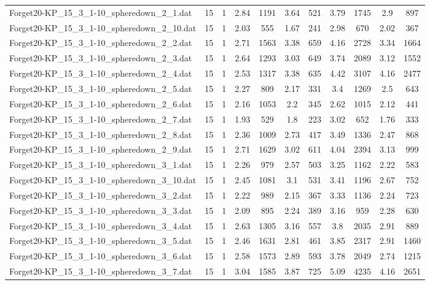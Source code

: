 \begin{table}[!ht]
\begin{tabular}{lcccccccccc}
Forget20-KP\_15\_3\_1-10\_spheredown\_2\_1.dat & 15 & 1 & 2.84 & 1191 & 3.64 & 521 & 3.79 & 1745 & 2.9 & 897 \\
Forget20-KP\_15\_3\_1-10\_spheredown\_2\_10.dat & 15 & 1 & 2.03 & 555 & 1.67 & 241 & 2.98 & 670 & 2.02 & 367 \\
Forget20-KP\_15\_3\_1-10\_spheredown\_2\_2.dat & 15 & 1 & 2.71 & 1563 & 3.38 & 659 & 4.16 & 2728 & 3.34 & 1664 \\
Forget20-KP\_15\_3\_1-10\_spheredown\_2\_3.dat & 15 & 1 & 2.64 & 1293 & 3.03 & 649 & 3.74 & 2089 & 3.12 & 1552 \\
Forget20-KP\_15\_3\_1-10\_spheredown\_2\_4.dat & 15 & 1 & 2.53 & 1317 & 3.38 & 635 & 4.42 & 3107 & 4.16 & 2477 \\
Forget20-KP\_15\_3\_1-10\_spheredown\_2\_5.dat & 15 & 1 & 2.27 & 809 & 2.17 & 331 & 3.4 & 1269 & 2.5 & 643 \\
Forget20-KP\_15\_3\_1-10\_spheredown\_2\_6.dat & 15 & 1 & 2.16 & 1053 & 2.2 & 345 & 2.62 & 1015 & 2.12 & 441 \\
Forget20-KP\_15\_3\_1-10\_spheredown\_2\_7.dat & 15 & 1 & 1.93 & 529 & 1.8 & 223 & 3.02 & 652 & 1.76 & 333 \\
Forget20-KP\_15\_3\_1-10\_spheredown\_2\_8.dat & 15 & 1 & 2.36 & 1009 & 2.73 & 417 & 3.49 & 1336 & 2.47 & 868 \\
Forget20-KP\_15\_3\_1-10\_spheredown\_2\_9.dat & 15 & 1 & 2.71 & 1629 & 3.02 & 611 & 4.04 & 2394 & 3.13 & 999 \\
Forget20-KP\_15\_3\_1-10\_spheredown\_3\_1.dat & 15 & 1 & 2.26 & 979 & 2.57 & 503 & 3.25 & 1162 & 2.22 & 583 \\
Forget20-KP\_15\_3\_1-10\_spheredown\_3\_10.dat & 15 & 1 & 2.45 & 1081 & 3.1 & 531 & 3.41 & 1196 & 2.67 & 752 \\
Forget20-KP\_15\_3\_1-10\_spheredown\_3\_2.dat & 15 & 1 & 2.22 & 989 & 2.15 & 367 & 3.33 & 1136 & 2.24 & 723 \\
Forget20-KP\_15\_3\_1-10\_spheredown\_3\_3.dat & 15 & 1 & 2.09 & 895 & 2.24 & 389 & 3.16 & 959 & 2.28 & 630 \\
Forget20-KP\_15\_3\_1-10\_spheredown\_3\_4.dat & 15 & 1 & 2.63 & 1305 & 3.16 & 557 & 3.8 & 2035 & 2.91 & 889 \\
Forget20-KP\_15\_3\_1-10\_spheredown\_3\_5.dat & 15 & 1 & 2.46 & 1631 & 2.81 & 461 & 3.85 & 2317 & 2.91 & 1460 \\
Forget20-KP\_15\_3\_1-10\_spheredown\_3\_6.dat & 15 & 1 & 2.58 & 1573 & 2.89 & 593 & 3.78 & 2049 & 2.74 & 1215 \\
Forget20-KP\_15\_3\_1-10\_spheredown\_3\_7.dat & 15 & 1 & 3.04 & 1585 & 3.87 & 725 & 5.09 & 4235 & 4.16 & 2651 \\

\end{tabular}
\end{table}
